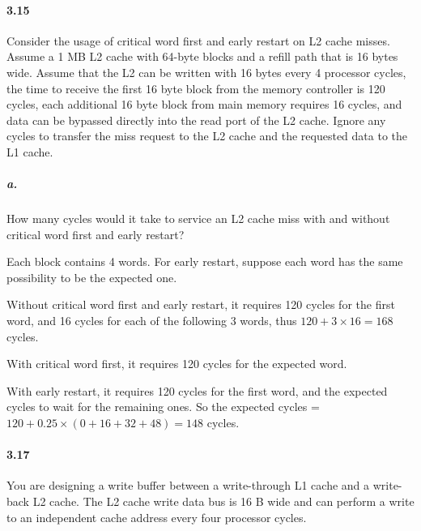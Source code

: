 \documentclass{article}
\begin{document}
\paragraph{3.15} Consider the usage of critical word first and early restart on L2 cache misses. Assume a 1 MB L2 cache with 64-byte blocks and a refill path that is 16 bytes wide. Assume that the L2 can be written with 16 bytes every 4 processor cycles, the time to receive the first 16 byte block from the memory controller is 120 cycles, each additional 16 byte block from main memory requires 16 cycles, and data can be bypassed directly into the read port of the L2 cache. Ignore any cycles to transfer the miss request to the L2 cache and the requested data to the L1 cache.

\subparagraph{a.} How many cycles would it take to service an L2 cache miss with and without critical word first and early restart?

Each block contains 4 words. For early restart, suppose each word has the same possibility to be the expected one.

Without critical word first and early restart, it requires 120 cycles for the first word, and 16 cycles for each of the following 3 words, thus $120+3\times16=168$ cycles.

With critical word first, it requires 120 cycles for the expected word.

With early restart, it requires 120 cycles for the first word, and the expected cycles to wait for the remaining ones. So the expected cycles = $120 + 0.25\times(0 + 16 + 32 + 48) = 148$ cycles.

\paragraph{3.17} You are designing a write buffer between a write-through L1 cache and a write-back L2 cache. The L2 cache write data bus is 16 B wide and can perform a write to an independent cache address every four processor cycles.
\end{document}
